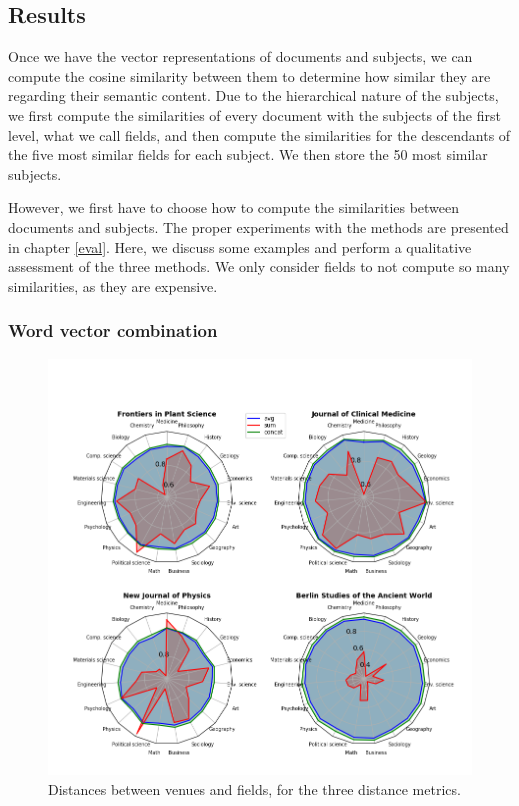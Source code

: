 \subsection{Results} \label{unsupervised_approach_results}

Once we have the vector representations of documents and subjects, we can compute the cosine similarity between them to determine how similar they are regarding their semantic content. Due to the hierarchical nature of the subjects, we first compute the similarities of every document with the subjects of the first level, what we call fields, and then compute the similarities for the descendants of the five most similar fields for each subject. We then store the 50 most similar subjects.

However, we first have to choose how to compute the similarities between documents and subjects. The proper experiments with the methods are presented in chapter \ref{eval}. Here, we discuss some examples and perform a qualitative assessment of the three methods. We only consider fields to not compute so many similarities, as they are expensive.

\subsubsection{Word vector combination} \label{unsupervised_approach_results_combination}

\begin{figure}
\includegraphics[width=\textwidth]{figures/unsupervised_approach/results/radar charts.png}
  \caption{Distances between venues and fields, for the three distance metrics.}
  \label{fig:combination_distance}
\end{figure}

